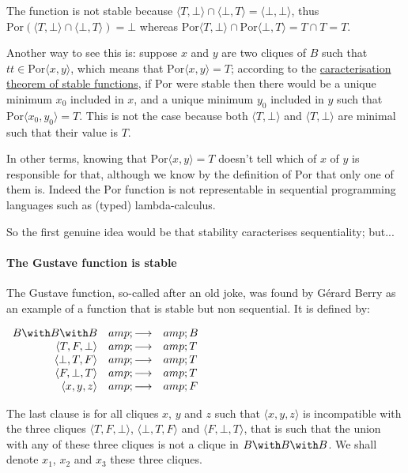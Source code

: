 The function is not stable because
\(\langle T,\bot\rangle \cap \langle \bot, T\rangle = \langle\bot, \bot\rangle\),
thus
\(\mathrm{Por}(\langle T,\bot\rangle \cap \langle \bot, T\rangle) = \bot\)
whereas
\(\mathrm{Por}\langle T,\bot\rangle \cap \mathrm{Por}\langle \bot, T\rangle = T\cap T = T\).

Another way to see this is: suppose \(x\) and \(y\) are two cliques of
\(B\) such that \(tt\in \mathrm{Por}\langle x, y\rangle\), which means
that \(\mathrm{Por}\langle x, y\rangle = T\); according to the
\protect\hyperlink{Stable_functions}{caracterisation theorem of stable
functions}, if \(\mathrm{Por}\) were stable then there would be a unique
minimum \(x_0\) included in \(x\), and a unique minimum \(y_0\) included
in \(y\) such that \(\mathrm{Por}\langle x_0, y_0\rangle = T\). This is
not the case because both \(\langle T,\bot\rangle\) and
\(\langle T,\bot\rangle\) are minimal such that their value is \(T\).

In other terms, knowing that \(\mathrm{Por}\langle x, y\rangle = T\)
doesn't tell which of \(x\) of \(y\) is responsible for that, although
we know by the definition of \(\mathrm{Por}\) that only one of them is.
Indeed the \(\mathrm{Por}\) function is not representable in sequential
programming languages such as (typed) lambda-calculus.

So the first genuine idea would be that stability caracterises
sequentiality; but...

\paragraph{The Gustave function is
stable}\label{the-gustave-function-is-stable}

The Gustave function, so-called after an old joke, was found by Gérard
Berry as an example of a function that is stable but non sequential. It
is defined by:

\(\begin{array}{rcl}
  B\with B\with B           &amp;\longrightarrow&amp; B\\
  \langle T, F, \bot\rangle &amp;\longrightarrow&amp; T\\
  \langle \bot, T, F\rangle &amp;\longrightarrow&amp; T\\
  \langle F, \bot, T\rangle &amp;\longrightarrow&amp; T\\
  \langle x, y, z\rangle    &amp;\longrightarrow&amp; F
\end{array}\)

The last clause is for all cliques \(x\), \(y\) and \(z\) such that
\(\langle x, y ,z\rangle\) is incompatible with the three cliques
\(\langle T, F, \bot\rangle\), \(\langle \bot, T, F\rangle\) and
\(\langle F, \bot, T\rangle\), that is such that the union with any of
these three cliques is not a clique in \(B\with B\with B\). We shall
denote \(x_1\), \(x_2\) and \(x_3\) these three cliques.

